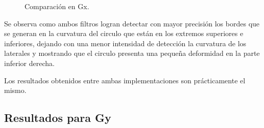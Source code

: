 \documentclass[11pt, letterpaper]{article}
\begin{document}
\begin{figure}[h]
	\caption{Comparación en Gx.}
	\label{fig:comparacion gx}
\end{figure}		

Se observa como ambos filtros logran detectar con mayor precisión los bordes que se generan en la curvatura del circulo que están en los extremos superiores e inferiores, dejando con una menor intensidad de detección la curvatura de los laterales y mostrando que el circulo presenta una pequeña deformidad en la parte inferior derecha.

Los resultados obtenidos entre ambas implementaciones son prácticamente el mismo.

\newpage

\subsection{Resultados para Gy}
\end{document}
